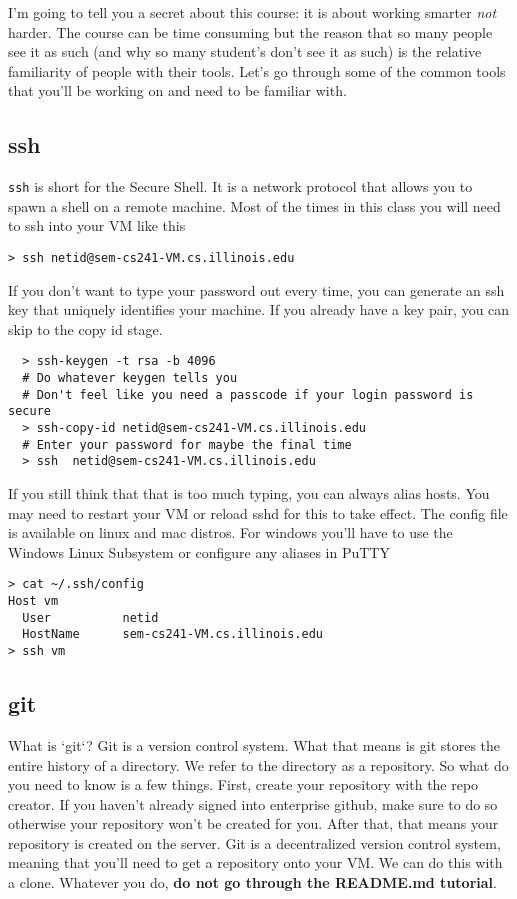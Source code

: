 I'm going to tell you a secret about this course: it is about working smarter \textit{not} harder. The course can be time consuming but the reason that so many people see it as such (and why so many student's don't see it as such) is the relative familiarity of people with their tools. Let's go through some of the common tools that you'll be working on and need to be familiar with.

\subsection{ssh}

\texttt{ssh} is short for the Secure Shell. It is a network protocol that allows you to spawn a shell on a remote machine.
Most of the times in this class you will need to ssh into your VM like this

\begin{lstlisting}
> ssh netid@sem-cs241-VM.cs.illinois.edu
\end{lstlisting}

If you don't want to type your password out every time, you can generate an ssh key that uniquely identifies your machine. If you already have a key pair, you can skip to the copy id stage.

\begin{lstlisting}
  > ssh-keygen -t rsa -b 4096
  # Do whatever keygen tells you
  # Don't feel like you need a passcode if your login password is secure
  > ssh-copy-id netid@sem-cs241-VM.cs.illinois.edu
  # Enter your password for maybe the final time
  > ssh  netid@sem-cs241-VM.cs.illinois.edu
\end{lstlisting}

If you still think that that is too much typing, you can always alias hosts. You may need to restart your VM or reload sshd for this to take effect. The config file is available on linux and mac distros. For windows you'll have to use the Windows Linux Subsystem or configure any aliases in PuTTY
\begin{lstlisting}
> cat ~/.ssh/config
Host vm
  User          netid
  HostName      sem-cs241-VM.cs.illinois.edu
> ssh vm
\end{lstlisting}

\subsection{git}

What is `git`? Git is a version control system. What that means is git stores the entire history of a directory. We refer to the directory as a repository. So what do you need to know is a few things. First, create your repository with the repo creator. If you haven't already signed into enterprise github, make sure to do so otherwise your repository won't be created for you. After that, that means your repository is created on the server. Git is a decentralized version control system, meaning that you'll need to get a repository onto your VM. We can do this with a clone. Whatever you do, \textbf{do not go through the README.md tutorial}. 

